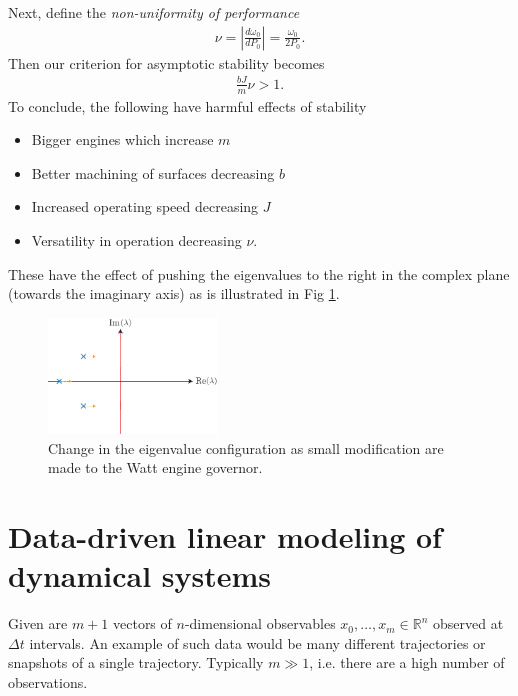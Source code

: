 \begin{ex}
\begin{enumerate}
\end{enumerate}
Next, define the \emph{non-uniformity of performance}
\begin{align}
	\nu = \left| \frac{d \omega_0}{d P_0} \right| = \frac{\omega_0}{2P_0}.
\end{align}
Then our criterion for asymptotic stability becomes
\begin{align}
\frac{bJ}{m}\nu > 1.	
\end{align}
To conclude, the following have harmful effects of stability
\begin{itemize}
	\item Bigger engines which increase $m$ 
	\item Better machining of surfaces decreasing $b$ 
	\item Increased operating speed decreasing $J$ 
	\item Versatility in operation decreasing $\nu $.
\end{itemize}
These have the effect of pushing the eigenvalues to the right in the complex plane (towards the imaginary axis) as is illustrated in Fig \ref{fig:watt_eigv}.
\begin{figure}[h!]
	\centering
	\includegraphics[width=0.4\textwidth]{figures/ch2/21watt_eigv}
	\caption{Change in the eigenvalue configuration as small modification are made to the Watt engine governor.}
	\label{fig:watt_eigv}
\end{figure}
\end{ex}
\newpage

 \section{Data-driven linear modeling of dynamical systems}
 Given are $m+1$ vectors of $n$-dimensional observables $x_0,\ldots,x_m \in \mathbb{R}^{n}$ observed at $\Delta t$ intervals. An example of such data would be many different trajectories or snapshots of a single trajectory. Typically $m \gg 1$, i.e. there are a high number of observations.

